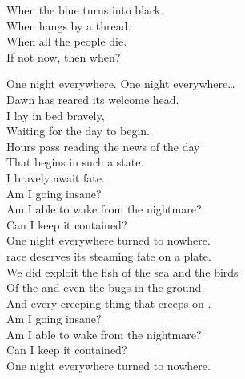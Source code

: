 When the blue  turns into black. \\
When  hangs by a thread. \\
When all the people die. \\
If not now, then when? \\





One night everywhere. One night everywhere… \\

Dawn has reared its welcome head. \\
I lay in bed bravely, \\
Waiting for the day to begin. \\

Hours pass reading the news of the day \\
That begins in such a state. \\
I bravely await fate. \\

Am I going insane? \\
Am I able to wake from the nightmare? \\
Can I keep it contained? \\
One night everywhere turned to nowhere. \\

 race deserves its steaming fate on a plate. \\
We did exploit the fish of the sea and the birds \\
Of the  and even the bugs in the ground \\
And every creeping thing that creeps on . \\

Am I going insane? \\
Am I able to wake from the nightmare? \\
Can I keep it contained? \\
One night everywhere turned to nowhere. \\




